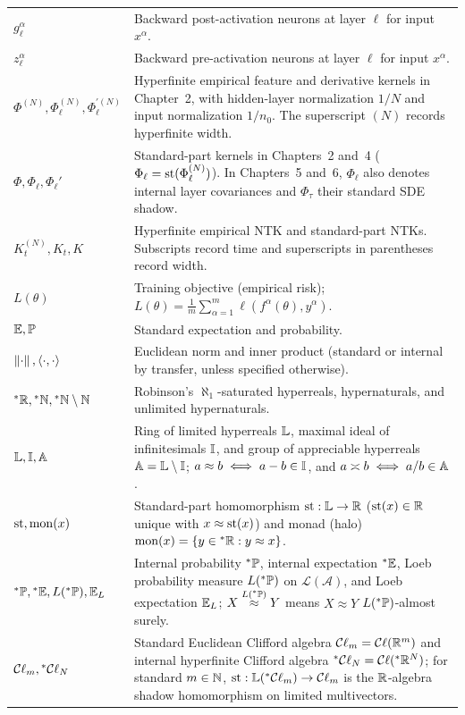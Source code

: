 \begin{xltabular}{\textwidth}{@{}lX@{}}
$g_\ell^\alpha$ & Backward post-activation neurons at layer $\ell$ for input $x^\alpha$. \\
$z_\ell^\alpha$ & Backward pre-activation neurons at layer $\ell$ for input $x^\alpha$. \\
$\Phi^{(N)}, \Phi_\ell^{(N)}, \Phi_\ell^{\prime(N)}$ & Hyperfinite empirical feature and derivative kernels in Chapter~2, with hidden-layer normalization $1/N$ and input normalization $1/n_0$. The superscript $(N)$ records hyperfinite width. \\
$\Phi, \Phi_\ell, \Phi_\ell'$ & Standard-part kernels in Chapters~2 and~4 ($\Phi_\ell = \operatorname{st}(\Phi_\ell^{(N)})$). In Chapters~5 and~6, $\Phi_\ell$ also denotes internal layer covariances and $\Phi_\tau$ their standard SDE shadow. \\
$K_t^{(N)}, K_t, K$ & Hyperfinite empirical NTK and standard-part NTKs. Subscripts record time and superscripts in parentheses record width. \\
$L(\theta)$ & Training objective (empirical risk); $L(\theta) = \frac{1}{m}\sum_{\alpha=1}^m \ell(f^\alpha(\theta), y^\alpha)$. \\
$\mathbb{E}, \mathbb{P}$ & Standard expectation and probability. \\
$\left\lVert \cdot \right\rVert, \left\langle \cdot, \cdot \right\rangle$ & Euclidean norm and inner product (standard or internal by transfer, unless specified otherwise). \\
\midrule
${}^*\mathbb{R}, {}^*\mathbb{N}, {}^*\mathbb{N} \setminus \mathbb{N}$ & Robinson's $\aleph_1$-saturated hyperreals, hypernaturals, and unlimited hypernaturals. \\
$\mathbb{L}, \mathbb{I}, \mathbb{A}$ & Ring of limited hyperreals $\mathbb{L}$, maximal ideal of infinitesimals $\mathbb{I}$, and group of appreciable hyperreals $\mathbb{A} = \mathbb{L} \setminus \mathbb{I}$; $a \approx b \iff a - b \in \mathbb{I}$, and $a \asymp b \iff a/b \in \mathbb{A}$. \\
$\operatorname{st}, \operatorname{mon}(x)$ & Standard-part homomorphism $\operatorname{st} : \mathbb{L} \to \mathbb{R}$ ($\operatorname{st}(x) \in \mathbb{R}$ unique with $x \approx \operatorname{st}(x)$) and monad (halo) $\operatorname{mon}(x) = \{y \in {}^*\mathbb{R} : y \approx x\}$. \\
${}^*\mathbb{P}, {}^*\mathbb{E}, L({}^*\mathbb{P}), \mathbb{E}_L$ & Internal probability ${}^*\mathbb{P}$, internal expectation ${}^*\mathbb{E}$, Loeb probability measure $L({}^*\mathbb{P})$ on $\mathcal{L}(\mathcal{A})$, and Loeb expectation $\mathbb{E}_L$; $X \stackrel{L({}^*\mathbb{P})}{\approx} Y$ means $X \approx Y$ $L({}^*\mathbb{P})$-almost surely. \\
\midrule
$\mathcal{C}\ell_m, {}^*\mathcal{C}\ell_N$ & Standard Euclidean Clifford algebra $\mathcal{C}\ell_m = \mathcal{C}\ell(\mathbb{R}^m)$ and internal hyperfinite Clifford algebra ${}^*\mathcal{C}\ell_N = \mathcal{C}\ell({}^*\mathbb{R}^N)$; for standard $m \in \mathbb{N}$, $\operatorname{st} : \mathbb{L}({}^*\mathcal{C}\ell_m) \to \mathcal{C}\ell_m$ is the $\mathbb{R}$-algebra shadow homomorphism on limited multivectors. \\

\end{xltabular}

